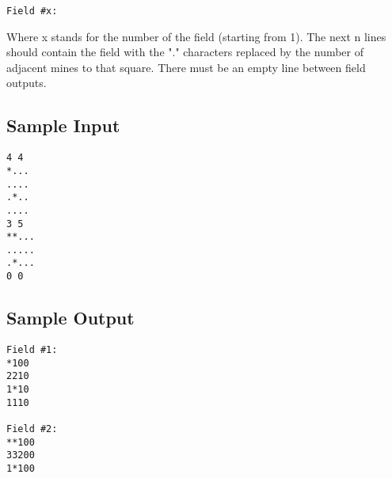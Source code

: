 \begin{verbatim}
Field #x:
\end{verbatim}

Where x stands for the number of the field (starting from 1). The next n lines should
contain the field with the "." characters replaced by the number of adjacent mines
to that square. There must be an empty line between field outputs.

\subsection*{Sample Input}

\begin{verbatim}
4 4
*...
....
.*..
....
3 5
**...
.....
.*...
0 0
\end{verbatim}

\subsection*{Sample Output}

\begin{verbatim}
Field #1:
*100
2210
1*10
1110

Field #2:
**100
33200
1*100
\end{verbatim}


